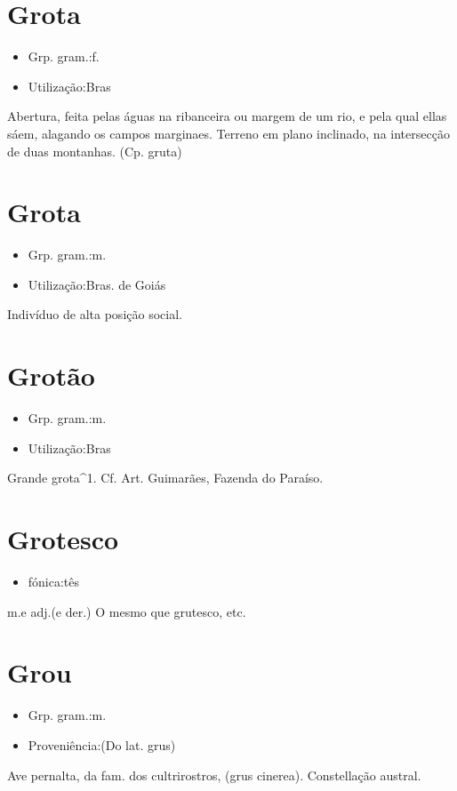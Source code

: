 \section{Grota}
\begin{itemize}
\item {Grp. gram.:f.}
\end{itemize}
\begin{itemize}
\item {Utilização:Bras}
\end{itemize}
Abertura, feita pelas águas na ribanceira ou margem de um rio, e pela qual ellas sáem, alagando os campos marginaes.
Terreno em plano inclinado, na intersecção de duas montanhas.
(Cp. \textunderscore gruta\textunderscore )
\section{Grota}
\begin{itemize}
\item {Grp. gram.:m.}
\end{itemize}
\begin{itemize}
\item {Utilização:Bras. de Goiás}
\end{itemize}
Indivíduo de alta posição social.
\section{Grotão}
\begin{itemize}
\item {Grp. gram.:m.}
\end{itemize}
\begin{itemize}
\item {Utilização:Bras}
\end{itemize}
Grande grota^1. Cf. Art. Guimarães, \textunderscore Fazenda do Paraíso\textunderscore .
\section{Grotesco}
\begin{itemize}
\item {fónica:tês}
\end{itemize}
\textunderscore m.\textunderscore  e \textunderscore adj.\textunderscore  (e der.)
O mesmo que \textunderscore grutesco\textunderscore , etc.
\section{Grou}
\begin{itemize}
\item {Grp. gram.:m.}
\end{itemize}
\begin{itemize}
\item {Proveniência:(Do lat. \textunderscore grus\textunderscore )}
\end{itemize}
Ave pernalta, da fam. dos cultrirostros, (\textunderscore grus cinerea\textunderscore ).
Constellação austral.
